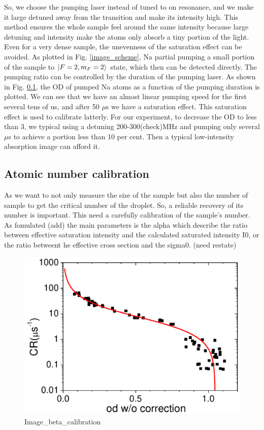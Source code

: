 So, we choose the pumping laser instead of tuned to on resonance, and we make it large detuned away from the transition and make its intensity high. This method ensures the whole sample feel around the same intensity because large detuning and intensity make the atoms only absorb a tiny portion of the light. Even for a very dense sample, the unevenness of the saturation effect can be avoided. As plotted in Fig. \ref{image_scheme}, Na partial pumping a small portion of the sample to $\ket{F=2,m_F=2}$ state, which then can be detected directly. The pumping ratio can be controlled by the duration of the pumping laser. As shown in Fig. \ref{}, the OD of pumped Na atoms as a function of the pumping duration is plotted. We can see that we have an almost linear pumping speed for the first several tens of us, and after 50 $\mu$s we have a saturation effect. This saturation effect is used to calibrate latterly. For our experiment, to decrease the OD to less than 3, we typical using a detuning 200-300(check)MHz and pumping only several $\mu$s to achieve a portion less than 10 per cent. Then a typical low-intensity absorption image can afford it.

\subsection{Atomic number calibration}

As we want to not only measure the size of the sample but also the number of sample to get the critical number of the droplet. So, a reliable recovery of its number is important. This need a carefully calibration of the sample's number. As fomulated (add) the main parameters is the alpha which describe the ratio between effective saturation intensity and the calculated saturated intensity I0, or the ratio betweent he effective cross section and the sigma0. (need restate) 

\begin{figure}[htb]
\begin{center}
\includegraphics[width = 0.8\linewidth]{figures/Image_beta_calibration.pdf}
\end{center}
\caption{Image_beta_calibration}
\label{Image_beta_calibration}
\end{figure}


